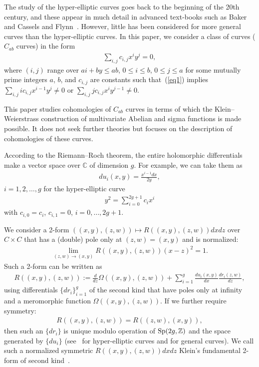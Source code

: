 \documentclass[pdftex]{sigma}
\numberwithin{equation}{section}
\theoremstyle{definition}
\begin{document}
The study of the hyper-elliptic curves goes back to the beginning of the 20th century, and these appear in much detail in advanced text-books such as Baker~\cite{baker} and Cassels and Flynn~\cite{cf}. However, little has been considered for more general curves than the hyper-elliptic curves. In this paper, we consider a class of curves ($C_{ab}$ curves) in the form
\begin{gather}\label{eq1}
\sum_{i,j}c_{i,j}x^iy^j=0,
\end{gather}
where $(i,j)$ range over $ai+by\leq ab$, $0\leq i\leq b$, $0\leq j\leq a$ for some mutually prime integers $a$, $b$, and $c_{i,j}$ are constants such that~(\ref{eq1}) implies $ \sum\limits_{i,j}ic_{i,j}x^{i-1}y^j\not=0$ or $ \sum\limits_{i,j}jc_{i,j}x^{i}y^{j-1}\not=0$.

This paper studies cohomologies of $C_{ab}$ curves in terms of which the Klein--Weierstrass construction of multivariate Abelian and sigma functions is made possible. It does not seek further theories but focuses on the description of cohomologies of these curves.

According to the Riemann--Roch theorem, the entire holomorphic dif\/ferentials make a vector space over $\mathbb C$ of dimension $g$. For example, we can take them as
\begin{gather}\label{eq97}
 du_i(x,y)=\frac{x^{i-1}dx}{2y} ,
\end{gather}
$i=1,2,\dots,g$ for the hyper-elliptic curve
\begin{gather}\label{eq3}
y^2=\sum_{i=0}^{2g+1}c_ix^i
\end{gather}
with $c_{i,0}=c_i$, $c_{i,1}=0$, $i=0,\dots,2g+1$.

We consider a 2-form $((x,y),(z,w))\mapsto R((x,y),(z,w))dxdz$ over $C\times C$ that has a (double) pole only at $(z,w)=(x,y)$ and is normalized:
\begin{gather*}\lim_{(z,w)\rightarrow (x,y)}R((x,y),(z,w))(x-z)^2=1.\end{gather*}
Such a 2-form can be written as
\begin{gather}\label{eq8}
R((x,y),(z,w)):=\frac{d}{dz}\Omega((x,y),(z,w))+\sum_{i=1}^g\frac{du_i(x,y)}{dx}\frac{dr_i(z,w)}{dz},
\end{gather}
using dif\/ferentials $\{dr_i\}_{i=1}^g$ of the second kind that have poles only at inf\/inity and a meromorphic function $\Omega((x,y),(z,w))$. If we further require symmetry:
\begin{gather*}R((x,y),(z,w))=R((z,w),(x,y)) ,\end{gather*}
then such an $\{dr_i\}$ is unique modulo operation of ${\rm Sp}(2g,{\mathbb Z})$ and the space generated by $\{du_i\}$ (see~\cite{b} for hyper-elliptic curves and \cite{BB, AA} for general curves). We call such a normalized symmetric $R((x,y),(z,w))dxdz$ Klein's fundamental 2-form of second kind~\cite{klein1,klein2}.
\end{document}
